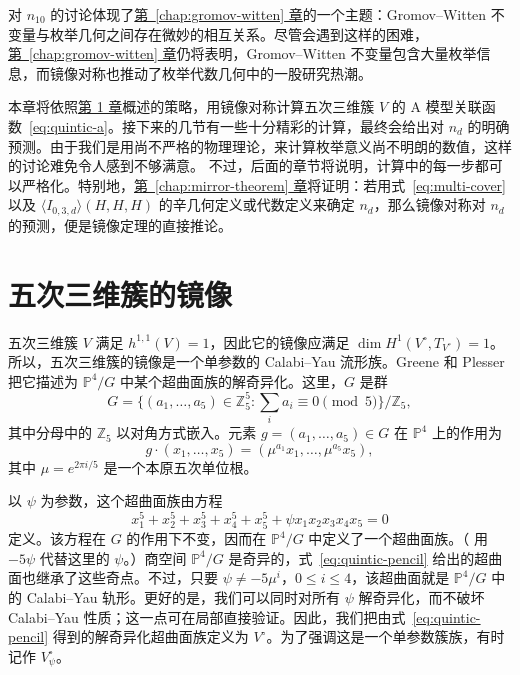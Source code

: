 对 $n_{10}$ 的讨论体现了\hyperref[chap:gromov-witten]{第~\ref*{chap:gromov-witten} 章}的一个主题：Gromov--Witten 不变量与枚举几何之间存在微妙的相互关系。尽管会遇到这样的困难，\hyperref[chap:gromov-witten]{第~\ref*{chap:gromov-witten} 章}仍将表明，Gromov--Witten 不变量包含大量枚举信息，而镜像对称也推动了枚举代数几何中的一股研究热潮。

本章将依照\hyperref[chap:introduction]{第 1 章}概述的策略，用镜像对称计算五次三维簇 $V$ 的 A 模型关联函数~\eqref{eq:quintic-a}。接下来的几节有一些十分精彩的计算，最终会给出对 $n_d$ 的明确预测。由于我们是用尚不严格的物理理论，来计算枚举意义尚不明朗的数值，这样的讨论难免令人感到不够满意。
不过，后面的章节将说明，计算中的每一步都可以严格化。特别地，\hyperref[chap:mirror-theorem]{第~\ref*{chap:mirror-theorem} 章}将证明：若用式~\eqref{eq:multi-cover} 以及 $\langle I_{0,3,d}\rangle(H,H,H)$ 的辛几何定义或代数定义来确定 $n_d$，那么镜像对称对 $n_d$ 的预测，便是镜像定理的直接推论。

\section{五次三维簇的镜像}\label{sec:quintic-mirror}

五次三维簇 $V$ 满足 $h^{1,1}(V)=1$，因此它的镜像应满足 $\dim H^1(V^\circ,T_{V^\circ})=1$。所以，五次三维簇的镜像是一个单参数的 Calabi--Yau 流形族。Greene 和 Plesser  把它描述为 $\mathbb P^4/G$ 中某个超曲面族的解奇异化。这里，$G$ 是群
\begin{equation}\label{eq:greene-plesser-group}
G=\bigl\{(a_1,\ldots,a_5)\in\mathbb Z_5^5:\textstyle\sum_i a_i\equiv0\pmod5\bigr\}/\mathbb Z_5,
\end{equation}
其中分母中的 $\mathbb Z_5$ 以对角方式嵌入。元素 $g=(a_1,\ldots,a_5)\in G$ 在 $\mathbb P^4$ 上的作用为
\[
g\cdot(x_1,\ldots,x_5)=(\mu^{a_1}x_1,\ldots,\mu^{a_5}x_5),
\]
其中 $\mu=e^{2\pi i/5}$ 是一个本原五次单位根。

以 $\psi$ 为参数，这个超曲面族由方程
\begin{equation}\label{eq:quintic-pencil}
x_1^5+x_2^5+x_3^5+x_4^5+x_5^5+\psi x_1x_2x_3x_4x_5=0
\end{equation}
定义。该方程在 $G$ 的作用下不变，因而在 $\mathbb P^4/G$ 中定义了一个超曲面族。（ 用 $-5\psi$ 代替这里的 $\psi$。）商空间 $\mathbb P^4/G$ 是奇异的，式~\eqref{eq:quintic-pencil} 给出的超曲面也继承了这些奇点。不过，只要 $\psi\ne-5\mu^i$，$0\leq i\leq4$，该超曲面就是 $\mathbb P^4/G$ 中的 Calabi--Yau 轨形。更好的是，我们可以同时对所有 $\psi$ 解奇异化，而不破坏 Calabi--Yau 性质；这一点可在局部直接验证。因此，我们把由式~\eqref{eq:quintic-pencil} 得到的解奇异化超曲面族定义为 $V^\circ$。为了强调这是一个单参数簇族，有时记作 $V_\psi^\circ$。

